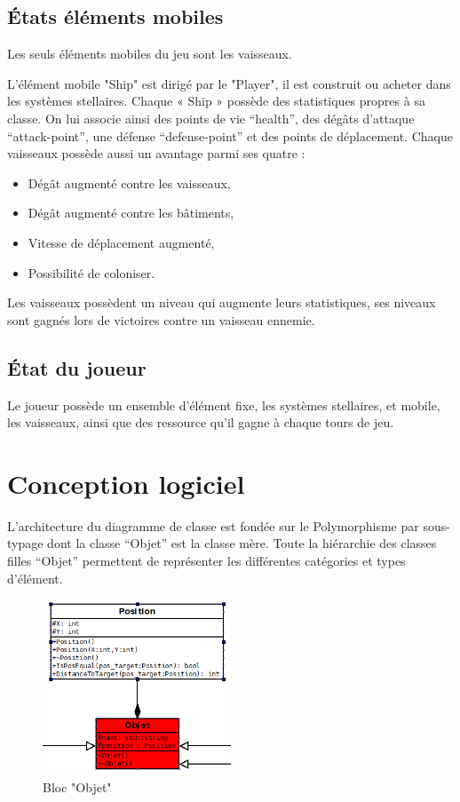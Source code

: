 \subsection{États éléments mobiles}

Les seuls éléments mobiles du jeu sont les vaisseaux.

L'élément mobile "Ship" est dirigé par le "Player", il est construit ou acheter dans les systèmes stellaires. Chaque « Ship » possède des statistiques propres à sa classe. On lui associe ainsi des points de vie “health”, des dégâts d'attaque “attack-point”, une défense “defense-point” et des points de déplacement. Chaque vaisseaux possède aussi un avantage parmi ses quatre :\\

\begin{itemize}
\item Dégât augmenté contre les vaisseaux,
\item Dégât augmenté contre les bâtiments,
\item Vitesse de déplacement augmenté,
\item Possibilité de coloniser.
\end{itemize}
Les vaisseaux possèdent un niveau qui augmente leurs statistiques, ses niveaux sont gagnés lors de victoires contre un vaisseau ennemie. 

\subsection{État du joueur}

Le joueur possède un ensemble d'élément fixe, les systèmes stellaires, et mobile, les vaisseaux, ainsi que des ressource qu'il gagne à chaque tours de jeu.

\section{Conception logiciel}

L'architecture du diagramme de classe est fondée sur le Polymorphisme par sous-typage dont la classe “Objet” est la classe mère.
Toute la hiérarchie des classes filles “Objet” permettent de représenter les différentes
catégories et types d’élément.
\begin{figure}[!h]
\centering
\includegraphics[width=0.5\textwidth]{pics/final_state/classe_Objet1.PNG}
\caption[Bloc "Objet"]{\label{figure_simple}Bloc "Objet"}
\end{figure}

